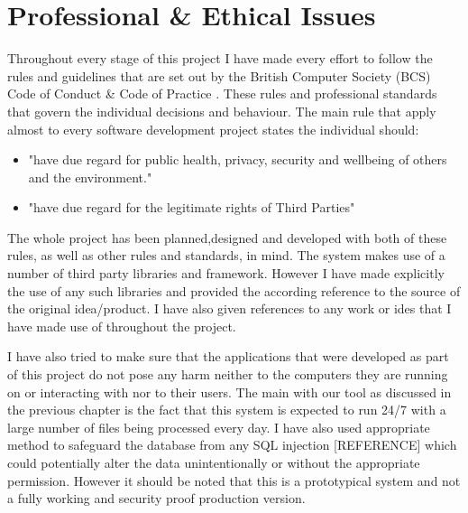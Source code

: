 \chapter{Professional \& Ethical Issues}
Throughout every stage of this project I have made every effort to follow the rules and guidelines that are set out by the British Computer Society (BCS) Code of Conduct \& Code of Practice \cite{bcsCodeOfConduct}. These rules and professional standards that govern the individual decisions and behaviour. The main rule that apply almost to every software development project states the individual should:
\begin{itemize}
	\item "have due regard for public health, privacy, security and wellbeing of others and
the environment."
	\item "have due regard for the legitimate rights of Third Parties"
\end{itemize}

The whole project has been planned,designed and developed with both of these rules, as well as other rules and standards, in mind. The system makes use of a number of third party libraries and framework. However I have made explicitly the use of any such libraries and provided the according reference to the source of the original idea/product. I have also given references to any work or ides that I have made use of throughout the project.

I have also tried to make sure that the applications that were developed as part of this project do not pose any harm neither to the computers they are running on or interacting with nor to their users. The main with our tool as discussed in the previous chapter is the fact that this system is expected to run 24/7 with a large number of files being processed every day. I have also used appropriate method to safeguard the database from any SQL injection [REFERENCE] which could potentially alter the data unintentionally or without the appropriate permission. However it should be noted that this is a prototypical system and not a fully working and security proof production version.